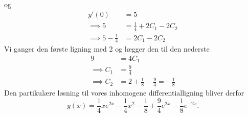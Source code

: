 \begin{eks}
  og
  \begin{align*}
  y'(0) &= 5 \\
  \implies 5 &= \frac{1}{4} + 2C_1 - 2C_2   \\
  \implies 5 - \frac{1}{4} &= 2C_1 - 2C_2
  \end{align*}
  Vi ganger den første ligning med 2 og lægger den til den nederste
  \begin{align*}
  9 &= 4C_1 \\
  \implies C_1 &= \frac{9}{4} \\
  \implies C_2 &= 2 + \frac{1}{8} - \frac{9}{4} = - \frac{1}{8} 
  \end{align*}
  Den partikulære løsning til vores inhomogene differentialligning bliver derfor
  \[
  y(x) = \frac{1}{4}xe^{2x} - \frac{1}{4}x^2 - \frac{1}{8} + \frac{9}{4}e^{2x} - \frac{1}{8}e^{-2x} 
  .\]
\end{eks}
